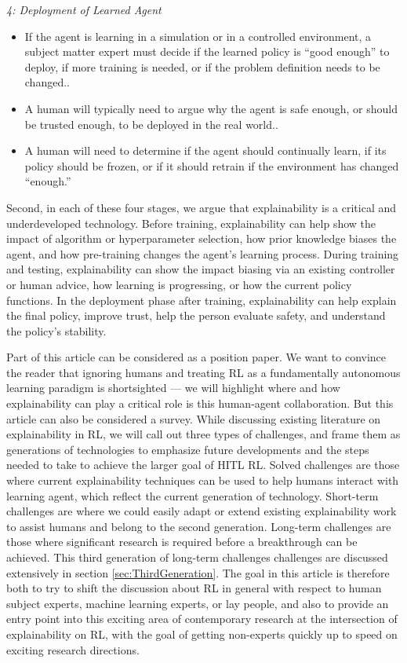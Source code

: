 \documentclass[twoside,11pt]{article}
\begin{document}
\emph{4: Deployment of Learned Agent}
    \begin{itemize}
        \item If the agent is learning in a simulation or in a controlled environment, a subject matter expert must decide if the learned policy is ``good enough'' to deploy, if more training is needed, or if the problem definition needs to be changed..
        \item A human will typically need to argue why the agent is safe enough, or should be trusted enough, to be deployed in the real world..
        \item A human will need to determine if the agent should continually learn, if its policy should be frozen, or if it should retrain if the environment has changed ``enough.'' 
    \end{itemize}

Second, in each of these four stages, we argue that explainability is a critical and underdeveloped technology. Before training, explainability can help show the impact of algorithm or hyperparameter selection, how prior knowledge biases the agent, and how pre-training changes the agent's learning process. During training and testing, explainability can show the impact biasing via an existing controller or human advice, how learning is progressing, or how the current policy functions. In the deployment phase after training, explainability can help explain the final policy, improve trust, help the person evaluate safety, and understand the policy's stability.

Part of this article can be considered as a position paper. We want to convince the reader that ignoring humans and treating RL as a fundamentally autonomous learning paradigm is shortsighted --- we will highlight where and how explainability can play a critical role is this human-agent collaboration. But this article can also be considered a survey. While discussing existing literature on explainability in RL, we will call out three types of challenges, and frame them as generations of technologies to emphasize future developments and the steps needed to take to achieve the larger goal of HITL RL. Solved challenges are those where current explainability techniques can be used to help humans interact with learning agent, which reflect the current generation of technology. Short-term challenges are where we could easily adapt or extend existing explainability work to assist humans and belong to the second generation. Long-term challenges are those where significant research is required before a breakthrough can be achieved. This third generation of long-term challenges challenges are discussed extensively in section \ref{sec:ThirdGeneration}. The goal in this article is therefore both to try to shift the discussion about RL in general with respect to human subject experts, machine learning experts, or lay people, and also to provide an entry point into this exciting area of contemporary research at the intersection of explainability on RL, with the goal of getting non-experts quickly up to speed on exciting research directions.
\end{document}

